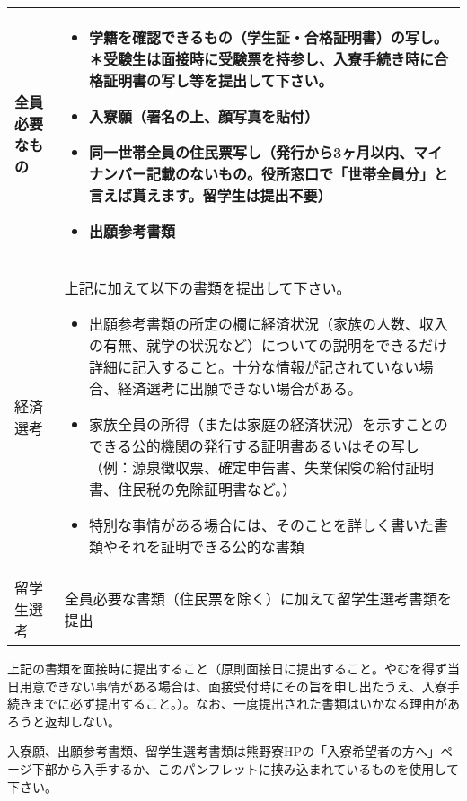 \begin{table}[htb]
  \begin{tabular}{|l|p{}|}
    \hline
    全員必要なもの & \vspace{-5mm}\begin{itemize}
        \item 学籍を確認できるもの（学生証・合格証明書）の写し。＊受験生は面接時に受験票を持参し、入寮手続き時に合格証明書の写し等を提出して下さい。
        \item 入寮願（署名の上、顔写真を貼付）
        \item 同一世帯全員の住民票写し（発行から3ヶ月以内、マイナンバー記載の\textbf{ない}もの。役所窓口で「世帯全員分」と言えば貰えます。留学生は提出不要）
        \item 出願参考書類
    \end{itemize} \\ \hline
    経済選考 & 上記に加えて以下の書類を提出して下さい。
    \vspace{-3mm}
    \begin{itemize}
      \item 出願参考書類の所定の欄に経済状況（家族の人数、収入の有無、就学の状況など）についての説明をできるだけ詳細に記入すること。十分な情報が記されていない場合、経済選考に出願できない場合がある。
      \item 家族全員の所得（または家庭の経済状況）を示すことのできる公的機関の発行する証明書あるいはその写し （例：源泉徴収票、確定申告書、失業保険の給付証明書、住民税の免除証明書など。）
      \item 特別な事情がある場合には、そのことを詳しく書いた書類やそれを証明できる公的な書類
    \end{itemize}\vspace{-0.8cm} \\ \hline
    留学生選考 & 全員必要な書類（住民票を除く）に加えて留学生選考書類を提出
    \\ \hline
  \end{tabular}
\end{table}
\par 上記の書類を面接時に提出すること（原則面接日に提出すること。やむを得ず当日用意できない事情がある場合は、面接受付時にその旨を申し出たうえ、入寮手続きまでに必ず提出すること。）。なお、一度提出された書類はいかなる理由があろうと返却しない。
\par 入寮願、出願参考書類、留学生選考書類は熊野寮HPの「入寮希望者の方へ」ページ下部から入手するか、このパンフレットに挟み込まれているものを使用して下さい。


